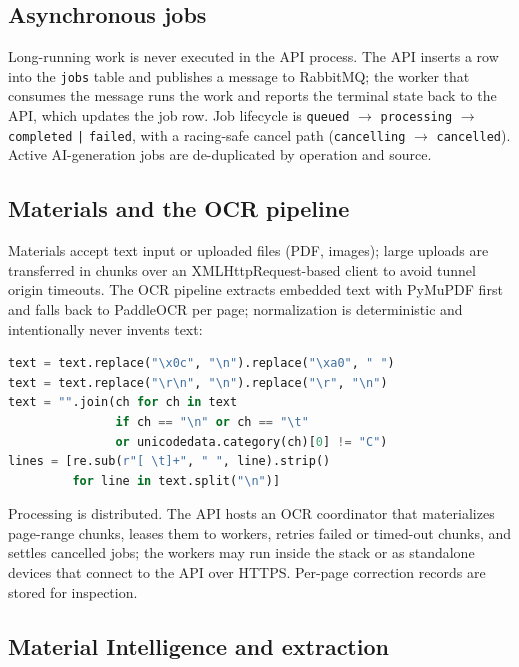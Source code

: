 \subsection{Asynchronous jobs}

Long-running work is never executed in the API process. The API inserts a row
into the \texttt{jobs} table and publishes a message to RabbitMQ; the worker
that consumes the message runs the work and reports the terminal state back
to the API, which updates the job row. Job lifecycle is
\texttt{queued} $\rightarrow$ \texttt{processing} $\rightarrow$
\texttt{completed} \texttt{|} \texttt{failed}, with a racing-safe cancel path
(\texttt{cancelling} $\rightarrow$ \texttt{cancelled}). Active AI-generation
jobs are de-duplicated by operation and source.

\subsection{Materials and the OCR pipeline}

Materials accept text input or uploaded files (PDF, images); large uploads
are transferred in chunks over an XMLHttpRequest-based client to avoid
tunnel origin timeouts. The OCR pipeline extracts embedded text with PyMuPDF
first and falls back to PaddleOCR per page; normalization is deterministic
and intentionally never invents text:

\begin{lstlisting}[language=Python,basicstyle=\ttfamily\footnotesize]
text = text.replace("\x0c", "\n").replace("\xa0", " ")
text = text.replace("\r\n", "\n").replace("\r", "\n")
text = "".join(ch for ch in text
               if ch == "\n" or ch == "\t"
               or unicodedata.category(ch)[0] != "C")
lines = [re.sub(r"[ \t]+", " ", line).strip()
         for line in text.split("\n")]
\end{lstlisting}

Processing is distributed. The API hosts an OCR coordinator that materializes
page-range chunks, leases them to workers, retries failed or timed-out chunks,
and settles cancelled jobs; the workers may run inside the stack or as
standalone devices that connect to the API over HTTPS. Per-page correction
records are stored for inspection.

\subsection{Material Intelligence and extraction}

